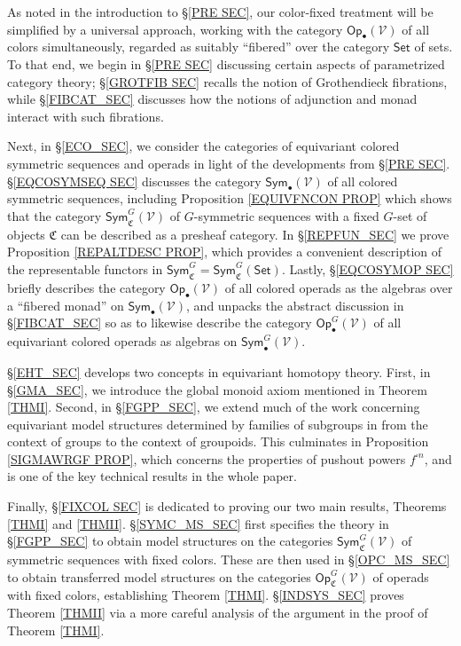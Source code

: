 \documentclass[a4paper,10pt
,draft
]{article}%
\numberwithin{equation}{section}
\numberwithin{figure}{section}
\theoremstyle{definition} %
\newcommand{\Op}{\mathsf{Op}}%
\newcommand{\V}{\ensuremath{\mathcal V}}
\newcommand{\1}{\ensuremath{\mathbbm 1}}%
\begin{document}
As noted in the introduction to 
\S \ref{PRE SEC}, our color-fixed treatment will be simplified by a universal approach,
working with the category $\Op_\bullet(\V)$ of all colors simultaneously,
regarded as suitably ``fibered'' over the category $\mathsf{Set}$
of sets.
To that end, 
we begin in \S \ref{PRE SEC} discussing certain aspects of parametrized category theory;
\S \ref{GROTFIB SEC}
recalls the notion of Grothendieck fibrations, 
while \S \ref{FIBCAT_SEC}
discusses how the notions of adjunction and monad %
interact with such fibrations.

Next, in \S \ref{ECO_SEC}, we consider the categories of
equivariant colored symmetric sequences and operads in light of the developments from \S \ref{PRE SEC}.
\S \ref{EQCOSYMSEQ SEC}
discusses the category
$\mathsf{Sym}_{\bullet}(\V)$
of all colored symmetric sequences, 
including
Proposition \ref{EQUIVFNCON PROP}
which shows that the category
$\mathsf{Sym}^G_{\mathfrak{C}}(\V)$
of $G$-symmetric sequences with a fixed $G$-set of objects
$\mathfrak{C}$ can be described as a presheaf category.
In \S \ref{REPFUN_SEC} we prove
Proposition \ref{REPALTDESC PROP},
which provides a convenient description of the representable functors in 
$\mathsf{Sym}^G_{\mathfrak{C}} = \mathsf{Sym}^G_{\mathfrak{C}}(\mathsf{Set})$.
%
Lastly, \S \ref{EQCOSYMOP SEC}
briefly describes the category 
$\mathsf{Op}_{\bullet}(\V)$ 
of all colored operads as the algebras over a ``fibered monad''
on  
$\mathsf{Sym}_{\bullet}(\V)$,
and unpacks the abstract discussion in \S \ref{FIBCAT_SEC}
so as to likewise describe the category 
$\mathsf{Op}_{\bullet}^G(\V)$ 
of all equivariant colored operads
as algebras on 
$\mathsf{Sym}^G_{\bullet}(\V)$.

\S \ref{EHT_SEC} develops two concepts in equivariant homotopy theory.
First, in \S \ref{GMA_SEC}, we introduce the global monoid axiom mentioned in Theorem \ref{THMI}.
Second, in \S \ref{FGPP_SEC}, 
we extend much of the work 
concerning equivariant model structures determined by families of subgroups in \cite[\S 6]{BP_geo}
from the context of groups to the context of groupoids.
This culminates in 
Proposition \ref{SIGMAWRGF PROP},
which concerns the properties of pushout powers $f^{\square n}$,
and is one of the key technical results in the whole paper. %


Finally, \S \ref{FIXCOL SEC}
is dedicated to proving our two main results, Theorems \ref{THMI} and \ref{THMII}.
%
\S \ref{SYMC_MS_SEC} first specifies the theory in
\S \ref{FGPP_SEC}
to obtain model structures on the categories
$\mathsf{Sym}^G_{\mathfrak{C}}(\V)$ of symmetric sequences with fixed colors.
These are then used in \S \ref{OPC_MS_SEC}
to obtain transferred model structures on the 
categories
$\mathsf{Op}^G_{\mathfrak{C}}(\V)$
of operads with fixed colors, establishing Theorem \ref{THMI}.
\S \ref{INDSYS_SEC} proves Theorem \ref{THMII}
via a more careful analysis of the argument in the proof of 
Theorem \ref{THMI}.
\end{document}
